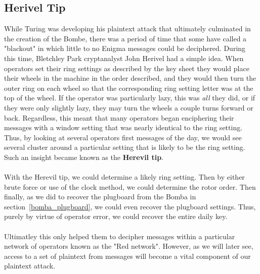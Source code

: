 
\subsection{Herivel Tip}
While Turing was developing his plaintext attack that ultimately
culminated in the creation of the Bombe, there was a period of time
that some have called a "blackout" in which little to no Enigma
messages could be deciphered. During this time, Bletchley Park
cryptanalyst John Herivel had a simple idea. When operators set their
ring settings as described by the key sheet they would place their
wheels in the machine in the order described, and they would then
turn the outer ring on each wheel so that the corresponding ring
setting letter was at the top of the wheel. If the operator was
particularly lazy, this was \emph{all} they did, or if they were only
slightly lazy, they may turn the wheels a couple turns forward or
back. Regardless, this meant that many operators began enciphering
their messages with a window setting that was nearly identical to the
ring setting. Thus, by looking at several operators first messages of
the day, we would see several cluster around a particular setting
that is likely to be the ring setting. Such an insight became known
as the {\bf{Herevil tip}}.
\\\\With the Herevil tip, we could determine a likely ring setting.
Then by either brute force or use of the clock method, we could
determine the rotor order. Then finally, as we did to recover the
plugboard from the Bomba in section~\ref{bomba_plugboard}, we could
even recover the plugboard settings. Thus, purely by virtue of
operator error, we could recover the entire daily key.
\\\\Ultimatley this only helped them to decipher messages within a
particular network of operators known as the "Red network". However,
as we will later see, access to a set of plaintext from messages will
become a vital component of our plaintext attack.

